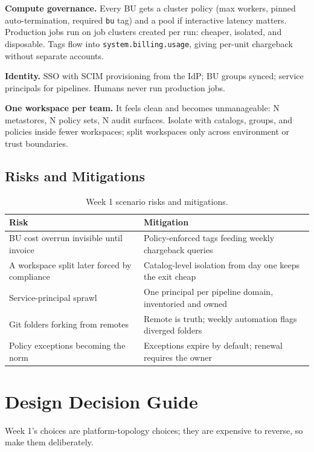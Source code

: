 \textbf{Compute governance.} Every BU gets a cluster policy (max workers, pinned auto-termination, required \texttt{bu} tag) and a pool if interactive latency matters. Production jobs run on job clusters created per run: cheaper, isolated, and disposable. Tags flow into \texttt{system.billing.usage}, giving per-unit chargeback without separate accounts.

\textbf{Identity.} SSO with SCIM provisioning from the IdP; BU groups synced; service principals for pipelines. Humans never run production jobs.

\begin{pitfall}
\textbf{One workspace per team.} It feels clean and becomes unmanageable: N metastores, N policy sets, N audit surfaces. Isolate with catalogs, groups, and policies inside fewer workspaces; split workspaces only across environment or trust boundaries.
\end{pitfall}

\subsection{Risks and Mitigations}
\begin{table}[H]
\centering
\small
\begin{tabular}{@{}p{4.6cm}p{7.6cm}@{}}
\toprule
\textbf{Risk} & \textbf{Mitigation} \\
\midrule
BU cost overrun invisible until invoice & Policy-enforced tags feeding weekly chargeback queries \\
A workspace split later forced by compliance & Catalog-level isolation from day one keeps the exit cheap \\
Service-principal sprawl & One principal per pipeline domain, inventoried and owned \\
Git folders forking from remotes & Remote is truth; weekly automation flags diverged folders \\
Policy exceptions becoming the norm & Exceptions expire by default; renewal requires the owner \\
\bottomrule
\end{tabular}
\caption{Week 1 scenario risks and mitigations.}
\label{tab:ch1-risks}
\end{table}

\section{Design Decision Guide}
%
Week 1's choices are platform-topology choices; they are expensive to reverse, so make them deliberately.

